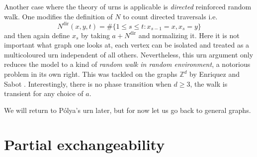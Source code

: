 \documentclass{emsprocart}
\theoremstyle{plain}
\begin{document}
Another case where the theory of urns is applicable is \emph{directed}
reinforced random walk. One modifies the definition of $N$ to count
directed traversals i.e.
\[
N^{\textrm{dir}}(x,y,t)=\#\{1\le s\le t:x_{s-1}=x,x_{s}=y\}
\]
and then again define $x_{s}$ by taking $a+N^{\textrm{dir}}$ and
normalizing it. Here it is not important what graph one looks at,
each vertex can be isolated and treated as a multicoloured urn independent
of all others. Nevertheless, this urn argument only reduces the model
to a kind of \emph{random walk in random environment}, a notorious
problem in its own right. This was tackled on the graphs $\mathbb{Z}^{d}$
by Enriquez and Sabot \cite{ES03,S11}. Interestingly, there is no
phase transition when $d\ge3$, the walk is transient for any choice
of $a$.

We will return to P\'olya's urn later, but for now let us go back
to general graphs.

\section{Partial exchangeability}
\end{document}
